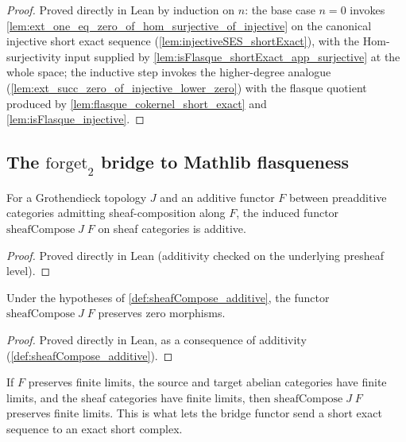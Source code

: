 \begin{proof}\leanok
 Proved directly in Lean by induction on \(n\): the base
  case \(n = 0\) invokes
  \cref{lem:ext_one_eq_zero_of_hom_surjective_of_injective} on the
  canonical injective short exact sequence
  (\cref{lem:injectiveSES_shortExact}), with the Hom-surjectivity input
  supplied by \cref{lem:isFlasque_shortExact_app_surjective} at the
  whole space; the inductive step invokes the higher-degree analogue
  (\cref{lem:ext_succ_zero_of_injective_lower_zero}) with the flasque
  quotient produced by \cref{lem:flasque_cokernel_short_exact} and
  \cref{lem:isFlasque_injective}.
\end{proof}

\subsection{The \(\mathrm{forget}_2\) bridge to Mathlib flasqueness}

\begin{definition}
  \label{def:sheafCompose_additive}
  For a Grothendieck topology \(J\) and an additive functor \(F\)
  between preadditive categories admitting sheaf-composition along
  \(F\), the induced functor \(\mathrm{sheafCompose}\;J\;F\) on sheaf
  categories is additive.
\end{definition}

\begin{proof}\leanok
 Proved directly in Lean (additivity checked on the
  underlying presheaf level).
\end{proof}

\begin{definition}
  \label{def:sheafCompose_preservesZero}
  Under the hypotheses of \cref{def:sheafCompose_additive}, the functor
  \(\mathrm{sheafCompose}\;J\;F\) preserves zero morphisms.
\end{definition}

\begin{proof}\leanok
 Proved directly in Lean, as a consequence of additivity
  (\cref{def:sheafCompose_additive}).
\end{proof}

\begin{definition}
  \label{def:sheafCompose_preservesFiniteLimits}
  If \(F\) preserves finite limits, the source and target abelian
  categories have finite limits, and the sheaf categories have finite
  limits, then \(\mathrm{sheafCompose}\;J\;F\) preserves finite limits.
  This is what lets the bridge functor send a short exact sequence to an
  exact short complex.
\end{definition}

